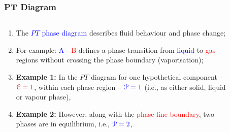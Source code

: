 \documentclass[10pt,compress]{beamer}
\begin{document}
\begin{frame}
 \frametitle{PT Diagram}
 \begin{columns}
   \begin{column}[l]{0.5\linewidth}
     \begin{enumerate}\scriptsize
        \item<1-> The \textcolor{blue}{$PT$ phase diagram} describes fluid behaviour and phase change; 
        \item<2-> For example: \textcolor{blue}{A}-\;-\;-\textcolor{red}{B} defines a phase transition from \textcolor{blue}{liquid} to \textcolor{red}{gas} regions without crossing the phase boundary (vaporisation);
        \item <3-> {\bf Example 1:} In the $PT$ diagram for one hypothetical component -- $\textcolor{red}{\mathcal{C}=1}$, within each phase region -- $\textcolor{blue}{\mathcal{P}=1}$ (i.e., as either solid, liquid or vapour phase),
        \item <4-> {\bf Example 2:} However, along with the \textcolor{red}{phase-line boundary}, two phases are in equilibrium, i.e., $\textcolor{blue}{\mathcal{P}=2}$,%
     \end{enumerate}
  \end{column}
  \begin{column}[l]{0.5\linewidth}\scriptsize
      \begin{figure}%
        \begin{center}

\end{center}
\end{figure}
\end{column}
\end{columns}
\end{frame}
\end{document}
